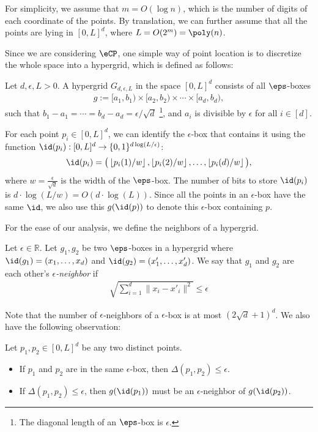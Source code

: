For simplicity, we assume that $m=O(\log n)$, which is the number of digits of each coordinate of the points. By translation, we can further assume that all the points are lying in $[0,L]^d$, where $L=O(2^m) = \poly(n)$. 

Since we are considering $\eCP$, one simple way of point location is to discretize the whole space into a hypergrid, which is defined as follows: 

\begin{definition}\label{def:hypergrid}
Let $d, \epsilon, L>0$. A hypergrid $G_{d,\epsilon,L}$ in the space $[0,L]^d$ consists of all  $\eps$-boxes 
\begin{align}
    g := [a_1,b_1)\times [a_2,b_2)\times \cdots \times [a_d,b_d), 
\end{align}
such that
$b_1-a_1=\cdots =b_d-a_d=\epsilon/\sqrt{d}$ \footnote{The diagonal length of an $\eps$-box is $\epsilon$.}, and $a_i$ is divisible by $\epsilon$ for all $i\in [d]$. 
\end{definition}

For each point $p_i\in [0,L]^d$, we can identify the $\epsilon$-box that contains it using the function $\id(p_i):[0,L]^d\rightarrow \{0,1\}^{d\log (L/\epsilon)}$:
\begin{align}\label{eq:id_fcn}
    \id(p_i)=\big(\left\lfloor p_i(1)/w\right\rfloor, \left\lfloor p_i(2)/w\right\rfloor, \dots, \left\lfloor p_i(d)/w\right\rfloor\big),
\end{align}
where $w=\frac{\epsilon}{\sqrt{d}}$ is the width of the $\eps$-box. The number of bits to store $\id(p_i)$ is $d\cdot \log(L/w)=O(d\cdot \log(L))$.
Since all the points in an $\epsilon$-box have the same $\id$, we also use this $g(\id(p))$ to denote this $\epsilon$-box containing $p$.

For the ease of our analysis, we define the neighbors of a hypergrid.
\begin{definition}\label{defn:kneighbor}
  Let $\epsilon\in \mathbb{R}$. Let $g_1, g_2$ be two $\eps$-boxes in a hypergrid where $\id(g_1) = (x_1,\dots,x_d)$ and $\id(g_2) = (x'_1,\dots,x'_d)$. We say that $g_1$ and $g_2$ are each other's \emph{$\epsilon$-neighbor} if 
\begin{align}
    \sqrt{\sum_{i=1}^d \|x_i-x'_i\|^2} \leq \epsilon
\end{align}
\end{definition}

Note that the number of $\epsilon$-neighbors of a $\epsilon$-box is at most $(2\sqrt{d}+1)^d$. We also have the following observation:
\begin{observation}\label{obs:2step}
Let $p_1,p_2\in [0,L]^d$ be any two distinct points.  
\begin{itemize}
    \item If $p_1$ and $p_2$ are in the same $\epsilon$-box, then $\Delta(p_1, p_2) \leq \epsilon$.
    \item If $\Delta(p_1, p_2)\leq \epsilon$, then $g(\id(p_1))$ must be an $\epsilon$-neighbor of $g(\id(p_2))$. 
\end{itemize} 
\end{observation}

